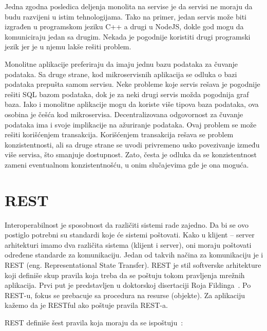 Jedna zgodna posledica deljenja monolita na servise je da servisi ne moraju da budu razvijeni u istim 
tehnologijama. Tako na primer, jedan servis može biti izgrađen u programskom jeziku C++ a drugi u 
NodeJS, dokle god mogu da komuniciraju jedan sa drugim. Nekada je pogodnije koristiti drugi programski 
jezik jer je u njemu lakše rešiti problem.

Monolitne aplikacije preferiraju da imaju jednu bazu podataka za čuvanje podataka. Sa druge strane, kod 
mikroservisnih aplikacija se odluka o bazi podataka prepušta samom servisu. Neke probleme koje servis 
rešava je pogodnije rešiti SQL bazom podataka, dok je za neki drugi servis možda pogodnija graf baza.
Iako i monolitne aplikacije mogu da koriste više tipova baza podataka, ova osobina je češća kod 
mikroservisa. Decentralizovana odgovornost za čuvanje podataka ima i svoje implikacije na ažuriranje 
podataka. Ovaj problem se može rešiti korišćenjem transakcija. Korišćenjem transakcija rešava se problem 
konzistentnosti, ali sa druge strane se uvodi privremeno usko povezivanje između više servisa, što 
smanjuje dostupnost. Zato, česta je odluka da se konzistentnost zameni eventualnom konzistentnošću, u 
onim slučajevima gde je ona moguća. 


\section{REST}\label{sec:arhitektura-rest}

Interoperabilnost je sposobnost da različiti sistemi rade zajedno. Da bi se ovo postiglo potrebni su 
standardi koje će sistemi poštovati. Kako u klijent -- server arhitekturi imamo dva različita sistema 
(klijent i server), oni moraju poštovati određene standarde za komunikaciju. Jedan od takvih načina za 
komunikaciju je i REST (eng. Representational State Transfer). REST je stil softverske arhitekture koji 
definiše skup pravila koja treba da se poštuju tokom pravljenja mrežnih aplikacija. Prvi put je 
predstavljen u doktorskoj disertaciji Roja Fildinga~\cite{REST_Roy}. Po REST-u, fokus se prebacuje sa 
procedura na resurse (objekte). Za aplikaciju kažemo da je RESTful ako poštuje pravila REST-a.


REST definiše šest pravila koja moraju da se ispoštuju~\cite{REST_API}:

